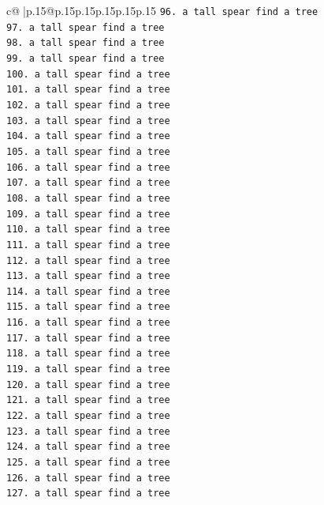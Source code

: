 \documentclass{article}
\begin{document}
{\begin{supertabular}{c@{$\;$}|p{.15\linewidth}@{}p{.15\linewidth}p{.15\linewidth}p{.15\linewidth}p{.15\linewidth}p{.15\linewidth}}
{{{\texttt{96. a tall spear find a tree} \\
\texttt{97. a tall spear find a tree} \\
\texttt{98. a tall spear find a tree} \\
\texttt{99. a tall spear find a tree} \\
\texttt{100. a tall spear find a tree} \\
\texttt{101. a tall spear find a tree} \\
\texttt{102. a tall spear find a tree} \\
\texttt{103. a tall spear find a tree} \\
\texttt{104. a tall spear find a tree} \\
\texttt{105. a tall spear find a tree} \\
\texttt{106. a tall spear find a tree} \\
\texttt{107. a tall spear find a tree} \\
\texttt{108. a tall spear find a tree} \\
\texttt{109. a tall spear find a tree} \\
\texttt{110. a tall spear find a tree} \\
\texttt{111. a tall spear find a tree} \\
\texttt{112. a tall spear find a tree} \\
\texttt{113. a tall spear find a tree} \\
\texttt{114. a tall spear find a tree} \\
\texttt{115. a tall spear find a tree} \\
\texttt{116. a tall spear find a tree} \\
\texttt{117. a tall spear find a tree} \\
\texttt{118. a tall spear find a tree} \\
\texttt{119. a tall spear find a tree} \\
\texttt{120. a tall spear find a tree} \\
\texttt{121. a tall spear find a tree} \\
\texttt{122. a tall spear find a tree} \\
\texttt{123. a tall spear find a tree} \\
\texttt{124. a tall spear find a tree} \\
\texttt{125. a tall spear find a tree} \\
\texttt{126. a tall spear find a tree} \\
\texttt{127. a tall spear find a tree} \\
}}}
\end{supertabular}}
\end{document}
